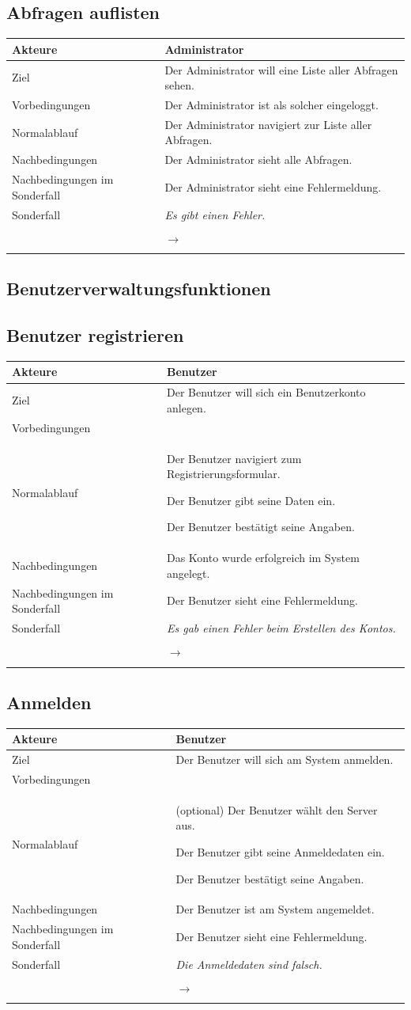 \documentclass[a4paper,10pt,titlepage]{article}
\makeatletter
\newcommand\novspace{\@minipagetrue}
\newenvironment{owncompactitem}{%
\compactitem
}{%
\@finalstrut\@arstrutbox
\@nameuse{endcompactitem}%
\aftergroup\let\aftergroup\@finalstrut\aftergroup\@gobble
}
\newenvironment{owncompactenum}{%
\compactenum
}{%
\@finalstrut\@arstrutbox
\@nameuse{endcompactenum}%
\aftergroup\let\aftergroup\@finalstrut\aftergroup\@gobble
}
\newcommand{\usecase}[7]
{\subsection{#1}
\setlength{\extrarowheight}{2pt}
\begin{tabular}{|p{0.2\textwidth}|p{0.9\textwidth}|}
\hline
  Akteure & #2\\\hline
  Ziel & #3\\\hline
  Vorbedingungen & \novspace
  	\begin{owncompactitem}[-] #4 \end{owncompactitem} \\\hline
  Normalablauf & \vspace{-7pt}
  	\begin{owncompactenum}[1.] #6 \end{owncompactenum} \\\hline
  Nachbedingungen & \novspace
  	\begin{owncompactitem}[-] #5 \end{owncompactitem} \\\hline
  #7
\end{tabular}
}
\newcommand{\kurzersonderfall}[3][\empty]
{
Sonderfall #2 & \vspace{-10pt}
	\textit{#3}
  	\ifthenelse{\equal{#1}{\empty}}
    	{\\\hline} %
    	{\\&\ensuremath{\rightarrow} #1 \\ [+1pt] \hline} %

}
\newcommand{\sondernachbedingung}[1]
{
Nachbedingungen im Sonderfall& \novspace
	\begin{owncompactitem}[-]
		#1
	\end{owncompactitem} \\\hline
}
\makeatother
\begin{document}
\usecase{Abfragen auflisten}{Administrator}%
{%
Der Administrator will eine Liste aller Abfragen sehen.
}{%
	\item Der Administrator ist als solcher eingeloggt.
}{%
	\item Der Administrator sieht alle Abfragen.
}{%
	\item Der Administrator navigiert zur Liste aller Abfragen.
}{%
\sondernachbedingung{
	\item Der Administrator sieht eine Fehlermeldung.
	}
\kurzersonderfall[]{}%
	{%
	Es gibt einen Fehler.
	}
}

\subsection*{Benutzerverwaltungsfunktionen}
\usecase{Benutzer registrieren}{Benutzer}%
{%
Der Benutzer will sich ein Benutzerkonto anlegen.
}{%
	\item 
}{%
	\item Das Konto wurde erfolgreich im System angelegt.
}{%
	\item Der Benutzer navigiert zum Registrierungsformular.
	\item Der Benutzer gibt seine Daten ein.
	\item Der Benutzer bestätigt seine Angaben.
}{%
\sondernachbedingung{
	\item Der Benutzer sieht eine Fehlermeldung.
	}
\kurzersonderfall[]{}%
	{%
	Es gab einen Fehler beim Erstellen des Kontos.
	}
}

\usecase{Anmelden}{Benutzer}%
{%
Der Benutzer will sich am System anmelden.
}{%
	\item 
}{%
	\item Der Benutzer ist am System angemeldet.
}{%
	\item (optional) Der Benutzer wählt den Server aus.
	\item Der Benutzer gibt seine Anmeldedaten ein.
	\item Der Benutzer bestätigt seine Angaben.
}{%
\sondernachbedingung{
	\item Der Benutzer sieht eine Fehlermeldung.
	}
\kurzersonderfall[]{}%
	{%
	Die Anmeldedaten sind falsch.
	}
}
\end{document}
